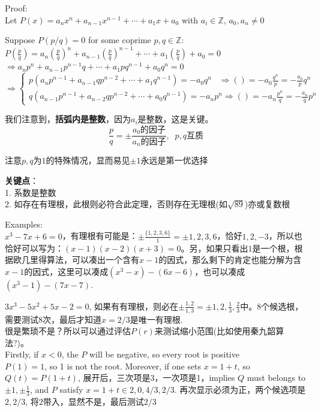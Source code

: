 \documentclass[../main.tex]{subfiles}
\begin{document}
Proof:\\
Let $P(x) = a_nx^n+a_{n-1}x^{n-1}+\cdots +a_1x+a_0$ with $a_i \in \mathbb{Z}$, $a_0,a_n \neq 0$

Suppose $P(p/q) = 0$ for some coprime $p,q \in \mathbb{Z}$:\\
$P(\frac{p}{q}) = a_{n}(\frac{p}{q})^{n} + a_{n-1}(\frac{p}{q})^{n-1}+\cdots + a_1(\frac{p}{q}) + a_{0} = 0$
$\Rightarrow a_{n}p^{n}+ a_{n-1}p^{n-1}q+\cdots +a_1pq^{n-1}+ a_{0}q^{n} = 0$\\
{
\setlength{\mathindent}{0pt}
\[
  \Rightarrow
  \begin{cases}
  p(a_{n}p^{n-1}+a_{n-1}qp^{n-2}+\cdots +a_1q^{n-1}) = -a_{0}q^{n} \;\;\; \Rightarrow ()=-a_{0}\frac{q^{n}}{p} =-\frac{a_0}{p}q^n\\
  q(a_{n-1}p^{n-1}+a_{n-2}qp^{n-2}+\cdots +a_{0}q^{n-1}) = -a_{n}p^{n} \Rightarrow ()=-a_{n}\frac{p^{n}}{q} = -\frac{a_n}{q}p^n
  \end{cases}
\]
}

我们注意到，\textbf{括弧内是整数}，因为$a_{i}$是整数，这是关键。
\[\frac{p}{q} = \pm \frac{a_0\text{的因子}}{a_n\text{的因子}},\;\; p,q\text{互质} \]

注意$p, q$为$1$的特殊情况，显而易见$\pm 1$永远是第一优选择

\textbf{关键点}：\\
1. 系数是整数\\
2. 如存在有理根，此根则必符合此定理，否则存在无理根(如$\sqrt{89}$)亦或复数根

Examples:\\
$x^3-7x+6=0$，有理根有可能是：$\pm \frac{\{1,2,3,6\}}{1}=\pm {1, 2, 3, 6}$，恰好$1, 2, -3$，所以也恰好可以写为：$(x-1)(x-2)(x+3)=0$。另，如果只看出$1$是一个根，根据欧几里得算法，可以凑出一个含有$x-1$的因式，那么剩下的肯定也能分解为含$x-1$的因式，这里可以凑成$(x^3-x)-(6x-6)$，也可以凑成$(x^3-1)-(7x-7)$.

$3x^3-5x^2+5x-2=0$, 如果有有理根，则必在$\pm \frac{1,2}{1,3}=\pm{1,2, \frac{1}{3}, \frac{2}{3}}$中。8个候选根，需要测试8次，最后才知道$x=2/3$是唯一有理根.\\
很是繁琐不是？所以可以通过评估$P(r)$来测试缩小范围(比如使用秦九韶算法?)。\\
Firstly, if $x<0$, the $P$ will be negative, so every root is positive\\
$P(1)=1$, so 1 is not the root. Moreover, if one sets $x=1+t$, so $Q(t)=P(1+t)$, 展开后，三次项是3，一次项是1，implies $Q$ must belongs to ${\pm 1, \pm \frac{1}{3}}$, and $P$ satisfy $x=1+t \in {2,0,4/3,2/3}$. 再次显示必须为正，两个候选项是$2, 2/3$, 将$2$带入，显然不是，最后测试$2/3$\
\end{document}
